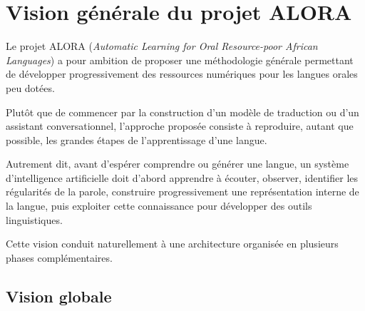 \section{Vision générale du projet ALORA}

Le projet ALORA (\textit{Automatic Learning for Oral Resource-poor African Languages})
a pour ambition de proposer une méthodologie générale permettant de développer
progressivement des ressources numériques pour les langues orales peu dotées.

Plutôt que de commencer par la construction d'un modèle de traduction ou d'un
assistant conversationnel, l'approche proposée consiste à reproduire, autant
que possible, les grandes étapes de l'apprentissage d'une langue.

Autrement dit, avant d'espérer comprendre ou générer une langue, un système
d'intelligence artificielle doit d'abord apprendre à écouter, observer,
identifier les régularités de la parole, construire progressivement une
représentation interne de la langue, puis exploiter cette connaissance pour
développer des outils linguistiques.

Cette vision conduit naturellement à une architecture organisée en plusieurs
phases complémentaires.


\subsection{Vision globale}

